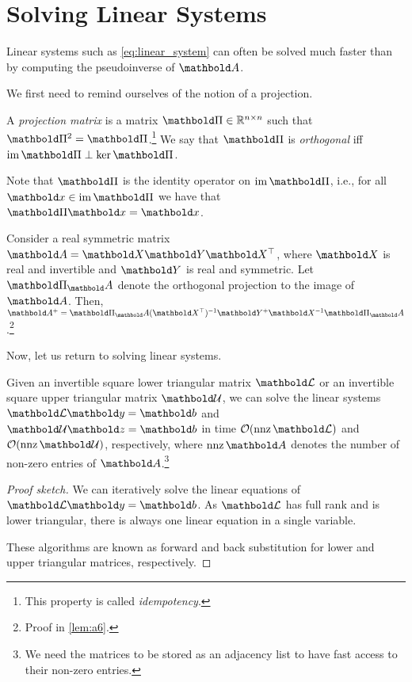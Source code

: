 \section{Solving Linear Systems}

Linear systems such as \cref{eq:linear_system} can often be solved much faster than by computing the pseudoinverse of $\mA$.

We first need to remind ourselves of the notion of a projection.

\begin{defn} A \emph{projection matrix} is a matrix $\mPi \in \R^{n \times n}$ such that $\mPi^2 = \mPi$.\footnote{This property is called \emph{idempotency}.} We say that $\mPi$ is \emph{orthogonal} iff $\im\mPi \perp \ker\mPi$.
\end{defn}
\begin{rmk}
Note that $\mPi$ is the identity operator on $\im\mPi$, i.e., for all $\vx \in \im\mPi$ we have that $\mPi\vx = \vx$.
\end{rmk}

\begin{lem} Consider a real symmetric matrix $\mA = \mX\mY\trans{\mX}$, where $\mX$ is real and invertible and $\mY$ is real and symmetric. Let $\mPi_\mA$ denote the orthogonal projection to the image of $\mA$. Then, $\pinv{\mA} = \mPi_\mA\inv{(\trans{\mX})}\pinv{\mY}\inv{\mX}\mPi_\mA$.\footnote{Proof in \cref{lem:a6}.}
\end{lem}

Now, let us return to solving linear systems.

\begin{lem}
Given an invertible square lower triangular matrix $\mCalL$ or an invertible square upper triangular matrix $\mCalU$, we can solve the linear systems $\mCalL\vy = \vb$ and $\mCalU\vz = \vb$ in time $\LandauO{\nnz{\mCalL}}$ and $\LandauO{\nnz{\mCalU}}$, respectively, where $\nnz{\mA}$ denotes the number of non-zero entries of $\mA$.\footnote{We need the matrices to be stored as an adjacency list to have fast access to their non-zero entries.}
\end{lem}\begin{proof}[Proof sketch] We can iteratively solve the linear equations of $\mCalL\vy = \vb$. As $\mCalL$ has full rank and is lower triangular, there is always one linear equation in a single variable.

These algorithms are known as forward and back substitution for lower and upper triangular matrices, respectively.
\end{proof}


